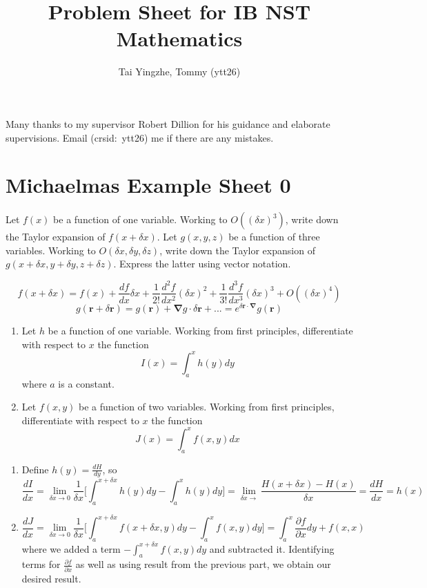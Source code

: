 \documentclass[a4paper]{article}
\title{\textbf{Problem Sheet for IB NST Mathematics}}
\author{Tai Yingzhe, Tommy (ytt26)}
\date{}
\begin{document}
\maketitle
\tableofcontents
\begin{foreword*}
Many thanks to my supervisor Robert Dillion for his guidance and elaborate supervisions. Email (crsid:~ytt26) me if there are any mistakes.
\end{foreword*}
\newpage
\section{Michaelmas Example Sheet 0}
\begin{qns}
Let $f(x)$ be a function of one variable. Working to $O((\delta x)^3)$, write down the Taylor expansion of $f(x+\delta x)$. Let $g(x,y,z)$ be a function of three variables. Working to $O(\delta x,\delta y,\delta z)$, write down the Taylor expansion of $g(x+\delta x,y+\delta y,z+\delta z)$. Express the latter using vector notation.
\end{qns}
\begin{ans}
$$f(x+\delta x)=f(x)+\frac{df}{dx}\delta x+\frac{1}{2!}\frac{d^2f}{dx^2}(\delta x)^2+\frac{1}{3!}\frac{d^3f}{dx^3}(\delta x)^3+O((\delta x)^4)$$
$$g(\mathbf{r}+\delta\mathbf{r})=g(\mathbf{r})+\boldsymbol{\nabla}g\cdot\delta\mathbf{r}+...=e^{\delta\mathbf{r}\cdot\boldsymbol{\nabla}}g(\mathbf{r})$$
\end{ans}
\begin{qns}\leavevmode
\begin{enumerate}[label=(\alph*)]
\item Let $h$ be a function of one variable. Working from first principles, differentiate with respect to $x$ the function
$$I(x)=\int_a^xh(y)dy$$
where $a$ is a constant.
\item Let $f(x,y)$ be a function of two variables. Working from first principles, differentiate with respect to $x$ the function
$$J(x)=\int_a^xf(x,y)dx$$
\end{enumerate}
\end{qns}
\begin{ans}\leavevmode
\begin{enumerate}[label=(\alph*)]
\item Define $h(y)=\frac{dH}{dy}$, so
$$\frac{dI}{dx}=\lim_{\delta x\rightarrow0}\frac{1}{\delta x}\bigg[\int_a^{x+\delta x}h(y)dy-\int_a^xh(y)dy\bigg]=\lim_{\delta x\rightarrow}\frac{H(x+\delta x)-H(x)}{\delta x}=\frac{dH}{dx}=h(x)$$
\item 
$$\frac{dJ}{dx}=\lim_{\delta x\rightarrow0}\frac{1}{\delta x}\bigg[\int_a^{x+\delta x}f(x+\delta x,y)dy-\int_a^xf(x,y)dy\bigg]=\int_a^x\frac{\partial f}{\partial x}dy+f(x,x)$$
where we added a term $-\int_a^{x+\delta x}f(x,y)dy$ and subtracted it. Identifying terms for $\frac{\partial f}{\partial x}$ as well as using result from the previous part, we obtain our desired result.
\end{enumerate}
\end{ans}
\end{document}
